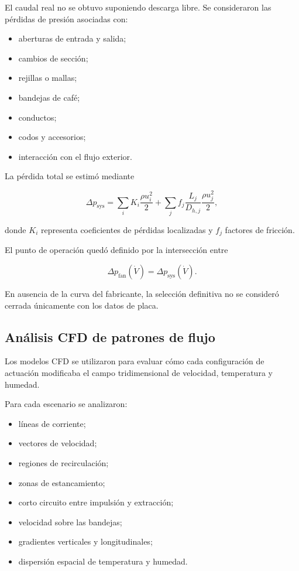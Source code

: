 El caudal real no se obtuvo suponiendo descarga libre. Se consideraron las pérdidas de presión asociadas con:

\begin{itemize}
    \item aberturas de entrada y salida;
    \item cambios de sección;
    \item rejillas o mallas;
    \item bandejas de café;
    \item conductos;
    \item codos y accesorios;
    \item interacción con el flujo exterior.
\end{itemize}

La pérdida total se estimó mediante

\begin{equation}
\Delta p_{\mathrm{sys}}
=
\sum_i
K_i
\frac{\rho u_i^2}{2}
+
\sum_j
f_j
\frac{L_j}{D_{h,j}}
\frac{\rho u_j^2}{2},
\label{eq:perdida_presion_sistema}
\end{equation}

donde $K_i$ representa coeficientes de pérdidas localizadas y $f_j$ factores de fricción.

El punto de operación quedó definido por la intersección entre

\begin{equation}
\Delta p_{\mathrm{fan}}(\dot V)
=
\Delta p_{\mathrm{sys}}(\dot V).
\label{eq:punto_operacion_ventilador}
\end{equation}

En ausencia de la curva del fabricante, la selección definitiva no se consideró cerrada únicamente con los datos de placa.

\subsection{Análisis CFD de patrones de flujo}
\label{subsec:analisis_cfd_actuadores}

Los modelos CFD se utilizaron para evaluar cómo cada configuración de actuación modificaba el campo tridimensional de velocidad, temperatura y humedad.

Para cada escenario se analizaron:

\begin{itemize}
    \item líneas de corriente;
    \item vectores de velocidad;
    \item regiones de recirculación;
    \item zonas de estancamiento;
    \item corto circuito entre impulsión y extracción;
    \item velocidad sobre las bandejas;
    \item gradientes verticales y longitudinales;
    \item dispersión espacial de temperatura y humedad.
\end{itemize}

